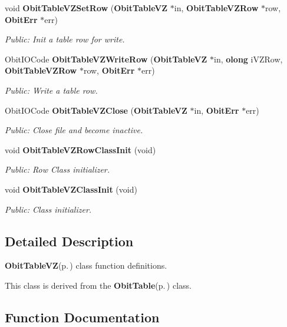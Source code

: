 \begin{CompactItemize}
void {\bf Obit\-Table\-VZSet\-Row} ({\bf Obit\-Table\-VZ} $\ast$in, {\bf Obit\-Table\-VZRow} $\ast$row, {\bf Obit\-Err} $\ast$err)
\begin{CompactList}\small\item\em Public: Init a table row for write. \item\end{CompactList}\item 
Obit\-IOCode {\bf Obit\-Table\-VZWrite\-Row} ({\bf Obit\-Table\-VZ} $\ast$in, {\bf olong} i\-VZRow, {\bf Obit\-Table\-VZRow} $\ast$row, {\bf Obit\-Err} $\ast$err)
\begin{CompactList}\small\item\em Public: Write a table row. \item\end{CompactList}\item 
Obit\-IOCode {\bf Obit\-Table\-VZClose} ({\bf Obit\-Table\-VZ} $\ast$in, {\bf Obit\-Err} $\ast$err)
\begin{CompactList}\small\item\em Public: Close file and become inactive. \item\end{CompactList}\item 
void {\bf Obit\-Table\-VZRow\-Class\-Init} (void)
\begin{CompactList}\small\item\em Public: Row Class initializer. \item\end{CompactList}\item 
void {\bf Obit\-Table\-VZClass\-Init} (void)
\begin{CompactList}\small\item\em Public: Class initializer. \item\end{CompactList}\end{CompactItemize}


\subsection{Detailed Description}
{\bf Obit\-Table\-VZ}{\rm (p.\,\pageref{structObitTableVZ})} class function definitions. 

This class is derived from the {\bf Obit\-Table}{\rm (p.\,\pageref{structObitTable})} class.

\subsection{Function Documentation}
